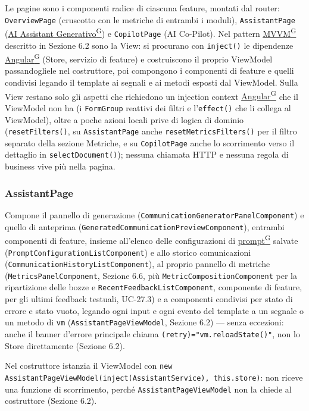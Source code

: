 \documentclass[a4paper,12pt]{article}
\providecommand{\glslink}[2]{\href{https://alittlebyte-19.github.io/Documentazione/glossario.html\#gls-#1}{\underline{#2}\textsuperscript{\scriptsize G}}}
\begin{document}
\begin{sloppypar}
Le pagine sono i componenti radice di ciascuna feature, montati dal router: \texttt{OverviewPage} (cruscotto con le metriche di entrambi i moduli), \texttt{AssistantPage} (\glslink{ai-assistant-generativo}{AI Assistant Generativo}) e \texttt{CopilotPage} (AI Co-Pilot). Nel pattern \glslink{mvvm-model-view-viewmodel}{MVVM} descritto in Sezione 6.2 sono la View: si procurano con \texttt{inject()} le dipendenze \glslink{angular}{Angular} (Store, servizio di feature) e costruiscono il proprio ViewModel passandogliele nel costruttore, poi compongono i componenti di feature e quelli condivisi legando il template ai segnali e ai metodi esposti dal ViewModel. Sulla View restano solo gli aspetti che richiedono un injection context \glslink{angular}{Angular} che il ViewModel non ha (i \texttt{FormGroup} reattivi dei filtri e l'\texttt{effect()} che li collega al ViewModel), oltre a poche azioni locali prive di logica di dominio (\texttt{resetFilters()}, su \texttt{AssistantPage} anche \texttt{resetMetricsFilters()} per il filtro separato della sezione Metriche, e su \texttt{CopilotPage} anche lo scorrimento verso il dettaglio in \texttt{selectDocument()}); nessuna chiamata HTTP e nessuna regola di business vive più nella pagina.

\subsubsection{AssistantPage}

Compone il pannello di generazione (\texttt{CommunicationGeneratorPanelComponent}) e quello di anteprima (\texttt{GeneratedCommunicationPreviewComponent}), entrambi componenti di feature, insieme all'elenco delle configurazioni di \glslink{prompt}{prompt} salvate (\texttt{PromptConfigurationListComponent}) e allo storico comunicazioni (\texttt{CommunicationHistoryListComponent}), al proprio pannello di metriche (\texttt{MetricsPanelComponent}, Sezione 6.6, più \texttt{MetricCompositionComponent} per la ripartizione delle bozze e \texttt{RecentFeedbackListComponent}, componente di feature, per gli ultimi feedback testuali, UC-27.3) e a componenti condivisi per stato di errore e stato vuoto, legando ogni input e ogni evento del template a un segnale o un metodo di \texttt{vm} (\texttt{AssistantPageViewModel}, Sezione 6.2) — senza eccezioni: anche il banner d'errore principale chiama \texttt{(retry)="vm.reloadState()"}, non lo Store direttamente (Sezione 6.2).

Nel costruttore istanzia il ViewModel con \texttt{new AssistantPageViewModel(inject(AssistantService), this.store)}: non riceve una funzione di scorrimento, perché \texttt{AssistantPageViewModel} non la chiede al costruttore (Sezione 6.2).


\end{sloppypar}
\end{document}
